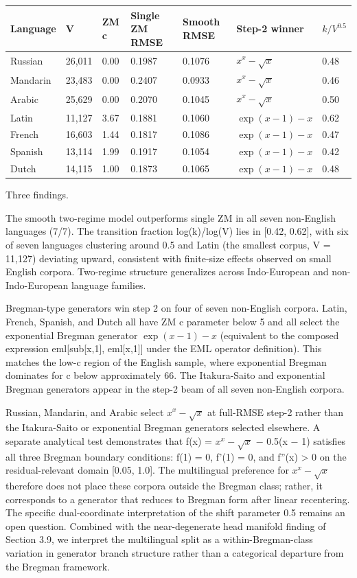 \documentclass[11pt]{article}
\begin{document}
\begin{center}
\small
\begin{tabular}{lllllll}
\toprule
Language & V & ZM c & Single ZM RMSE & Smooth RMSE & Step-2 winner & $k/V^{0.5}$ \\
\midrule
Russian & 26,011 & 0.00 & 0.1987 & 0.1076 & $x^x-\sqrt{x}$ & 0.48 \\
Mandarin & 23,483 & 0.00 & 0.2407 & 0.0933 & $x^x-\sqrt{x}$ & 0.46 \\
Arabic & 25,629 & 0.00 & 0.2070 & 0.1045 & $x^x-\sqrt{x}$ & 0.50 \\
Latin & 11,127 & 3.67 & 0.1881 & 0.1060 & $\exp(x-1)-x$ & 0.62 \\
French & 16,603 & 1.44 & 0.1817 & 0.1086 & $\exp(x-1)-x$ & 0.47 \\
Spanish & 13,114 & 1.99 & 0.1917 & 0.1054 & $\exp(x-1)-x$ & 0.42 \\
Dutch & 14,115 & 1.00 & 0.1873 & 0.1065 & $\exp(x-1)-x$ & 0.48 \\
\bottomrule
\end{tabular}
\end{center}

Three findings.

The smooth two-regime model outperforms single ZM in all seven non-English languages (7/7). The transition fraction log(k)/log(V) lies in [0.42, 0.62], with six of seven languages clustering around 0.5 and Latin (the smallest corpus, V = 11,127) deviating upward, consistent with finite-size effects observed on small English corpora. Two-regime structure generalizes across Indo-European and non-Indo-European language families.

Bregman-type generators win step 2 on four of seven non-English corpora. Latin, French, Spanish, and Dutch all have ZM c parameter below 5 and all select the exponential Bregman generator $\exp(x-1)-x$ (equivalent to the composed expression eml[sub[x,1], eml[x,1]] under the EML operator definition). This matches the low-c region of the English sample, where exponential Bregman dominates for c below approximately 66. The Itakura-Saito and exponential Bregman generators appear in the step-2 beam of all seven non-English corpora.

Russian, Mandarin, and Arabic select $x^x-\sqrt{x}$ at full-RMSE step-2 rather than the Itakura-Saito or exponential Bregman generators selected elsewhere. A separate analytical test demonstrates that f(x) = $x^x-\sqrt{x}$ − 0.5(x − 1) satisfies all three Bregman boundary conditions: f(1) = 0, f'(1) = 0, and f''(x) > 0 on the residual-relevant domain [0.05, 1.0]. The multilingual preference for $x^x-\sqrt{x}$ therefore does not place these corpora outside the Bregman class; rather, it corresponds to a generator that reduces to Bregman form after linear recentering. The specific dual-coordinate interpretation of the shift parameter 0.5 remains an open question. Combined with the near-degenerate head manifold finding of Section 3.9, we interpret the multilingual split as a within-Bregman-class variation in generator branch structure rather than a categorical departure from the Bregman framework.
\end{document}
